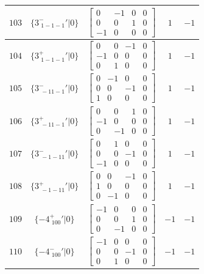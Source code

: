 \documentclass[fleqn,8pt]{jsarticle}
\begin{document}
\begin{longtable}{ccccc}
$ 103 $ & $ \{3^{-}_{\,\,1-1-1}{}'|0\} $ & $ \begin{bmatrix} 0 & -1 & 0 & 0 \\ 0 & 0 & 1 & 0 \\ -1 & 0 & 0 & 0 \end{bmatrix} $ & $ 1 $ & $ -1 $ \\ \hline
$ 104 $ & $ \{3^{+}_{\,\,1-1-1}{}'|0\} $ & $ \begin{bmatrix} 0 & 0 & -1 & 0 \\ -1 & 0 & 0 & 0 \\ 0 & 1 & 0 & 0 \end{bmatrix} $ & $ 1 $ & $ -1 $ \\ \hline
$ 105 $ & $ \{3^{-}_{\,\,-11-1}{}'|0\} $ & $ \begin{bmatrix} 0 & -1 & 0 & 0 \\ 0 & 0 & -1 & 0 \\ 1 & 0 & 0 & 0 \end{bmatrix} $ & $ 1 $ & $ -1 $ \\ \hline
$ 106 $ & $ \{3^{+}_{\,\,-11-1}{}'|0\} $ & $ \begin{bmatrix} 0 & 0 & 1 & 0 \\ -1 & 0 & 0 & 0 \\ 0 & -1 & 0 & 0 \end{bmatrix} $ & $ 1 $ & $ -1 $ \\ \hline
$ 107 $ & $ \{3^{-}_{\,\,-1-11}{}'|0\} $ & $ \begin{bmatrix} 0 & 1 & 0 & 0 \\ 0 & 0 & -1 & 0 \\ -1 & 0 & 0 & 0 \end{bmatrix} $ & $ 1 $ & $ -1 $ \\ \hline
$ 108 $ & $ \{3^{+}_{\,\,-1-11}{}'|0\} $ & $ \begin{bmatrix} 0 & 0 & -1 & 0 \\ 1 & 0 & 0 & 0 \\ 0 & -1 & 0 & 0 \end{bmatrix} $ & $ 1 $ & $ -1 $ \\ \hline
$ 109 $ & $ \{-4^{+}_{\,\,100}{}'|0\} $ & $ \begin{bmatrix} -1 & 0 & 0 & 0 \\ 0 & 0 & 1 & 0 \\ 0 & -1 & 0 & 0 \end{bmatrix} $ & $ -1 $ & $ -1 $ \\ \hline
$ 110 $ & $ \{-4^{-}_{\,\,100}{}'|0\} $ & $ \begin{bmatrix} -1 & 0 & 0 & 0 \\ 0 & 0 & -1 & 0 \\ 0 & 1 & 0 & 0 \end{bmatrix} $ & $ -1 $ & $ -1 $ \\ \hline

\end{longtable}
\end{document}
